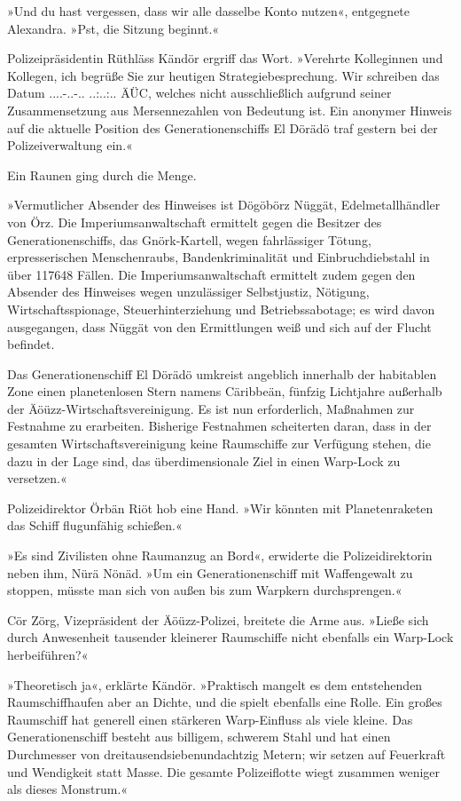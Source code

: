 »Und du hast vergessen, dass wir alle dasselbe Konto nutzen«, entgegnete Alexandra. »Pst, die Sitzung beginnt.«

Polizeipräsidentin Rüthläss Kändör ergriff das Wort. »Verehrte Kolleginnen und Kollegen, ich begrüße Sie zur heutigen Strategiebesprechung. Wir schreiben das Datum
....-..-.. ..:..:.. ÄÜC, %
welches nicht ausschließlich aufgrund seiner Zusammensetzung aus Mersennezahlen von Bedeutung ist. Ein anonymer Hinweis auf die aktuelle Position des Generationenschiffs El Dörädö traf gestern bei der Polizeiverwaltung ein.«

Ein Raunen ging durch die Menge.

»Vermutlicher Absender des Hinweises ist Dögöbörz Nüggät, Edelmetallhändler von Örz. Die Imperiumsanwaltschaft ermittelt gegen die Besitzer des Generationenschiffs, das Gnörk-Kartell, wegen fahrlässiger Tötung, erpresserischen Menschenraubs, Bandenkriminalität und Einbruchdiebstahl in über 117648 Fällen. Die Imperiumsanwaltschaft ermittelt zudem gegen den Absender des Hinweises wegen unzulässiger Selbstjustiz, Nötigung, Wirtschaftsspionage, Steuerhinterziehung und Betriebssabotage; es wird davon ausgegangen, dass Nüggät von den Ermittlungen weiß und sich auf der Flucht befindet.

Das Generationenschiff El Dörädö umkreist angeblich innerhalb der habitablen Zone einen planetenlosen Stern namens Cäribbeän, fünfzig Lichtjahre außerhalb der Äöüzz-Wirtschaftsvereinigung. Es ist nun erforderlich, Maßnahmen zur Festnahme zu erarbeiten. Bisherige Festnahmen scheiterten daran, dass in der gesamten Wirtschaftsvereinigung keine Raumschiffe zur Verfügung stehen, die dazu in der Lage sind, das überdimensionale Ziel in einen Warp-Lock zu versetzen.«

Polizeidirektor Örbän Riöt hob eine Hand. »Wir könnten mit Planetenraketen das Schiff flugunfähig schießen.«

»Es sind Zivilisten ohne Raumanzug an Bord«, erwiderte die Polizeidirektorin neben ihm, Nürä Nönäd. »Um ein Generationenschiff mit Waffengewalt zu stoppen, müsste man sich von außen bis zum Warpkern durchsprengen.«

Cör Zörg, Vizepräsident der Äöüzz-Polizei, breitete die Arme aus. »Ließe sich durch Anwesenheit tausender kleinerer Raumschiffe nicht ebenfalls ein Warp-Lock herbeiführen?«

»Theoretisch ja«, erklärte Kändör. »Praktisch mangelt es dem entstehenden Raumschiffhaufen aber an Dichte, und die spielt ebenfalls eine Rolle. Ein großes Raumschiff hat generell einen stärkeren Warp-Einfluss als viele kleine. Das Generationenschiff besteht aus billigem, schwerem Stahl und hat einen Durchmesser von dreitausendsiebenundachtzig Metern; wir setzen auf Feuerkraft und Wendigkeit statt Masse. Die gesamte Polizeiflotte wiegt zusammen weniger als dieses Monstrum.«

